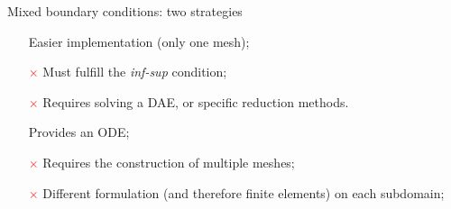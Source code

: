 \documentclass[aspectratio=169]{ISAE-Beamer}
\begin{document}
\begin{frame}{Mixed boundary conditions: two strategies}

\begin{tcbraster}[raster columns=2, raster equal height]
	\begin{tcolorbox}[width=0.4\textwidth, nobeforeafter, colframe=theme,title=Lagrange multiplier]%
		\begin{itemize}
			\item[\textcolor{green}{\checkmark}] Easier implementation (only one mesh);
			\item[\textcolor{red}{$\times$}] Must fulfill the \textit{inf-sup} condition;	
			\item[\textcolor{red}{$\times$}] Requires solving a DAE, or specific reduction methods.
		\end{itemize}
	\end{tcolorbox} 
	\begin{tcolorbox}[width=0.4\textwidth, nobeforeafter,  colframe=theme,title=Virtual domain decomposition]%
		\begin{itemize}
			\item[\textcolor{green}{\checkmark}] Provides an ODE;
			\item[\textcolor{red}{$\times$}] Requires the construction of multiple meshes;
			\item[\textcolor{red}{$\times$}] Different formulation (and therefore finite elements) on each subdomain;
		\end{itemize}
	\end{tcolorbox}
\end{tcbraster}
\end{frame}
\end{document}

